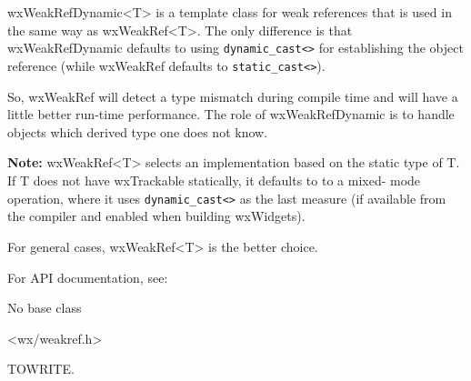 \section{}\label{wxweakrefdynamic}

wxWeakRefDynamic<T> is a template class for weak references that is used in 
the same way as wxWeakRef<T>. The only difference is that wxWeakRefDynamic 
defaults to using \texttt{dynamic\_cast<>} for establishing the object 
reference (while wxWeakRef defaults to \texttt{static\_cast<>}). 

So, wxWeakRef will detect a type mismatch during compile time and will
have a little better run-time performance. The role of wxWeakRefDynamic
is to handle objects which derived type one does not know. 

\textbf{Note:} wxWeakRef<T> selects an implementation based on the static type 
of T. If T does not have wxTrackable statically, it defaults to to a mixed-
mode operation, where it uses \texttt{dynamic\_cast<>} as the last measure (if 
available from the compiler and enabled when building wxWidgets). 

For general cases, wxWeakRef<T> is the better choice. 

For API documentation, see: 



No base class


<wx/weakref.h>






\label{wxweakrefdynamicwxweakrefdynamic}


TOWRITE.
